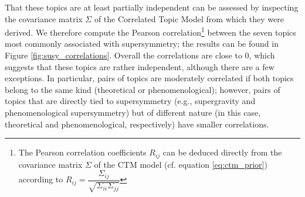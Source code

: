 \documentclass[smallextended]{svjour3}
\begin{document}
\begin{figure*}
    \centering
    
    \caption{\textbf{Categories of articles that contain specific terms refering to supersymmetry}. The plot represents the proportion of articles that belong to each of the categories ``Theory'', ``Phenomenology'' and ``Experiment'', depending on whether they contain any of the terms ``supersymmetric'', ``supersymmetry'', and ``susy'' in their title or abstract. Again, ``supersymmetric'' and ``supersymmetry'' mostly occur in theoretical papers, while ``susy'' more often occurs in phenomenological papers. The difference in the topics associated with the keyword ``supersymmetry'' and ``susy'' reflects the theoretical/phenomenological divide previously described.
     }
    \label{fig:susy_terms_cats}
\end{figure*}

That these topics are at least partially independent can be assessed by inspecting the covariance matrix $\Sigma$ of the Correlated Topic Model from which they were derived. We therefore compute the Pearson correlation\footnote{The Pearson correlation coefficients $R_{ij}$ can be deduced directly from the covariance matrix $\Sigma$ of the CTM model (cf. equation \eqref{eq:ctm_prior}) according to $R_{ij} = \dfrac{\Sigma_{ij}}{\sqrt{\Sigma_{ii}\Sigma_{jj}}}$} between the seven topics most commonly associated with supersymmetry; the results can be found in Figure \ref{fig:susy_correlations}. Overall the correlations are close to 0, which suggests that these topics are rather independent, although there are a few exceptions. In particular, pairs of topics are moderately correlated if both topics belong to the same kind (theoretical or phenomenological); however, pairs of topics that are directly tied to supersymmetry (e.g., supergravity and phenomenological supersymmetry) but of different nature (in this case, theoretical and phenomenological, respectively) have smaller correlations.

\begin{figure*}
    \centering
    \hspace*{-2em}
    \caption{\textbf{Correlation between the topics most associated to supersymmetry}. The Pearson correlation is comprised between -1 (perfect anti-correlation) and 1 (perfect correlation). A correlation close to 0 means that a pair of topic is partially independent, i.e. that they can arise or not in variable proportions in a paper.}
    \label{fig:susy_correlations}
\end{figure*}
\end{document}
